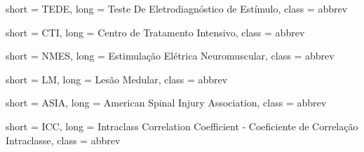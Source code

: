  {
	short = TEDE,
	long = Teste De Eletrodiagnóstico de Estímulo,
	class = abbrev
}

 {
	short = CTI,
	long = Centro de Tratamento Intensivo,
	class = abbrev
}

 {
	short = NMES,
	long =  Estimulação Elétrica Neuromuscular,
	class = abbrev
}

 {
	short = LM,
	long =  Lesão Medular,
	class = abbrev
}

 {
	short = ASIA,
	long =  American Spinal Injury Association,
	class = abbrev
}

 {
	short = ICC,
	long =  Intraclass Correlation Coefficient - Coeficiente de Correlação Intraclasse,
	class = abbrev
}